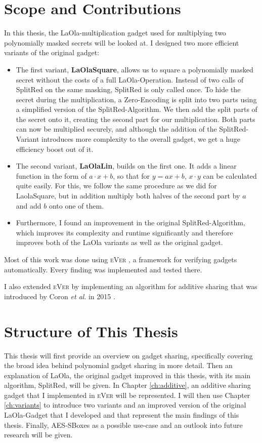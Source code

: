 \documentclass[english, version-2020-11]{uzl-thesis}
\makeatletter
\newcommand{\toolname}[1]{\textsc{#1}}
\newcommand{\etal}[0]{\textit{et al}\@.\xspace}
\makeatother
\begin{document}
\section{Scope and Contributions}
In this thesis, the LaOla-multiplication gadget \cite{BerndtBuyOneGetOneForFree} used for multiplying two polynomially masked secrets will be looked at. I designed two more efficient variants of the original gadget:
\begin{itemize}
  \item The first variant, \textbf{LaOlaSquare}, allows us to square a polynomially masked secret without the costs of a full LaOla-Operation. Instead of two calls of SplitRed on the same masking, SplitRed is only called once. To hide the secret during the multiplication, a Zero-Encoding is split into two parts using a simplified version of the SplitRed-Algorithm. We then add the split parts of the secret onto it, creating the second part for our multiplication. Both parts can now be multiplied securely, and although the addition of the SplitRed-Variant introduces more complexity to the overall gadget, we get a huge efficiency boost out of it.
  \item The second variant, \textbf{LaOlaLin}, builds on the first one. It adds a linear function in the form of $a\cdot x+b$, so that for $y=ax+b$, $x\cdot y$ can be calculated quite easily. For this, we follow the same procedure as we did for LaolaSquare, but in addition multiply both halves of the second part by $a$ and add $b$ onto one of them. 
  \item Furthermore, I found an improvement in the original SplitRed-Algorithm, which improves its complexity and runtime significantly and therefore improves both of the LaOla variants as well as the original gadget.
\end{itemize}
 Most of this work was done using \toolname{eVer} \cite{eVer2026}, a framework for verifying gadgets automatically. Every finding was implemented and tested there. 

I also extended \toolname{eVer} by implementing an algorithm for additive sharing that was introduced by Coron \etal in 2015 \cite{Coron2015}.

\section{Structure of This Thesis}
This thesis will first provide an overview on gadget sharing, specifically covering the broad idea behind polynomial gadget sharing in more detail. Then an explanation of LaOla, the original gadget improved in this thesis, with its main algorithm, SplitRed, will be given. In Chapter \ref{ch:additive}, an additive sharing gadget that I implemented in \toolname{eVer} will be represented. I will then use Chapter \ref{ch:variants} to introduce two variants and an improved version of the original LaOla-Gadget that I developed and that represent the main findings of this thesis. Finally, AES-SBoxes as a possible use-case and an outlook into future research will be given.
  
\end{document}
